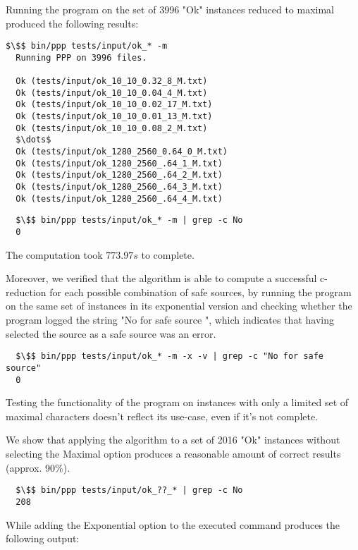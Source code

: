 Running the program on the set of 3996 "Ok" instances reduced to maximal produced the following results:

\lstset{style=code_block}

\begin{lstlisting}[belowskip=0pt]
  $\$$ bin/ppp tests/input/ok_* -m
  Running PPP on 3996 files.

  Ok (tests/input/ok_10_10_0.32_8_M.txt)
  Ok (tests/input/ok_10_10_0.04_4_M.txt)
  Ok (tests/input/ok_10_10_0.02_17_M.txt)
  Ok (tests/input/ok_10_10_0.01_13_M.txt)
  Ok (tests/input/ok_10_10_0.08_2_M.txt)
  $\dots$
  Ok (tests/input/ok_1280_2560_0.64_0_M.txt)
  Ok (tests/input/ok_1280_2560_.64_1_M.txt)
  Ok (tests/input/ok_1280_2560_.64_2_M.txt)
  Ok (tests/input/ok_1280_2560_.64_3_M.txt)
  Ok (tests/input/ok_1280_2560_.64_4_M.txt)
\end{lstlisting}

\begin{lstlisting}
  $\$$ bin/ppp tests/input/ok_* -m | grep -c No
  0
\end{lstlisting}

The computation took $773.97s$ to complete.

Moreover, we verified that the algorithm is able to compute a successful c-reduction for each possible combination of safe sources, by running the program on the same set of instances in its exponential version and checking whether the program logged the string "No for safe source \species{}", which indicates that having selected the source \species{} as a safe source was an error.

\begin{lstlisting}
  $\$$ bin/ppp tests/input/ok_* -m -x -v | grep -c "No for safe source"
  0
\end{lstlisting}

Testing the functionality of the program on instances with only a limited set of maximal characters doesn't reflect its use-case, even if it's not complete.

We show that applying the algorithm to a set of 2016 "Ok" instances without selecting the Maximal option produces a reasonable amount of correct results (approx. 90\%).

\begin{lstlisting}
  $\$$ bin/ppp tests/input/ok_??_* | grep -c No
  208
\end{lstlisting}

While adding the Exponential option to the executed command produces the following output:

